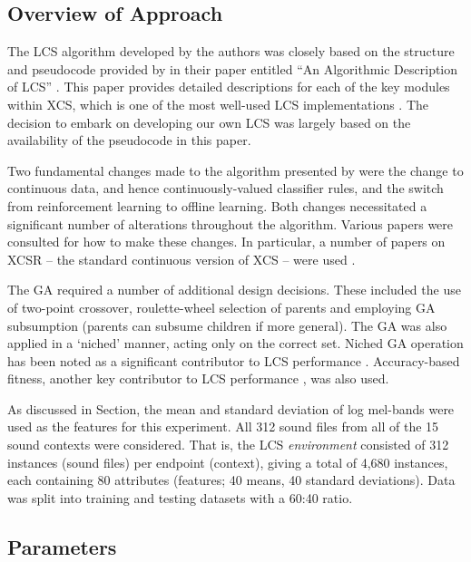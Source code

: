\documentclass[11pt]{article}
\begin{document}
\begin{multicols}{2}
\subsection{Overview of Approach}
\label{sec:exp2appr}

The LCS algorithm developed by the authors was closely based on the structure and pseudocode provided by \citeauthor{Butz2000} in their paper entitled ``An Algorithmic Description of LCS'' \cite{Butz2000}. This paper provides detailed descriptions for each of the key modules within XCS, which is one of the most well-used LCS implementations \cite{Sigaud2007}. The decision to embark on developing our own LCS was largely based on the availability of the pseudocode in this paper.

Two fundamental changes made to the algorithm presented by \citeauthor{Butz2000} were the change to continuous data, and hence continuously-valued classifier rules, and the switch from reinforcement learning to offline learning. Both changes necessitated a significant number of alterations throughout the algorithm. Various papers were consulted for how to make these changes. In particular, a number of papers on XCSR -- the standard continuous version of XCS -- were used \cite{Sowden2007,Stone2003,Wilson2000,Behdad2012}.

The GA required a number of additional design decisions. These included the use of two-point crossover, roulette-wheel selection of parents and employing GA subsumption (parents can subsume children if more general). The GA was also applied in a `niched' manner, acting only on the correct set. Niched GA operation has been noted as a significant contributor to LCS performance \cite{Lanzi2008}. Accuracy-based fitness, another key contributor to LCS performance \cite{Lanzi2008}, was also used.

As discussed in Section, the mean and standard deviation of log mel-bands were used as the features for this experiment. All 312 sound files from all of the 15 sound contexts were considered. That is, the LCS \textit{environment} consisted of 312 instances (sound files) per endpoint (context), giving a total of 4,680 instances, each containing 80 attributes (features; 40 means, 40 standard deviations). Data was split into training and testing datasets with a 60:40 ratio.







\subsection{Parameters}
\label{sec:exp2params}


\end{multicols}
\end{document}
